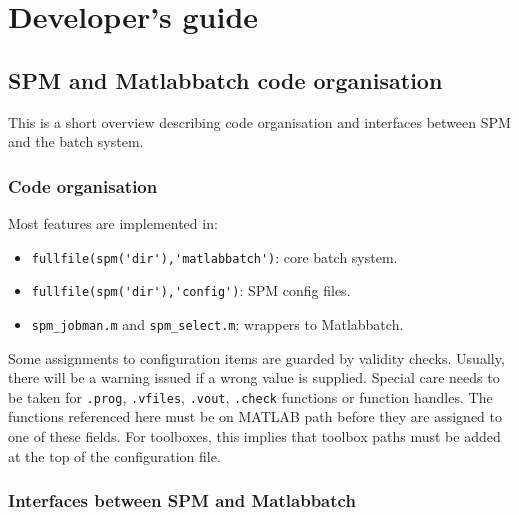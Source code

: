 \chapter{Developer's guide}
\label{Chap:batch:devel}

\section{SPM and Matlabbatch code organisation}

This is a short overview describing code organisation and interfaces between
SPM and the batch system.

\subsection{Code organisation}

Most features are implemented in:
\begin{itemize}
\item \verb|fullfile(spm('dir'),'matlabbatch')|: core batch system.
\item \verb|fullfile(spm('dir'),'config')|: SPM config files.
\item \verb|spm_jobman.m| and \verb|spm_select.m|: wrappers to Matlabbatch.
\end{itemize}

Some assignments to configuration items are guarded by validity
checks. Usually, there will be a warning issued if a wrong value is
supplied. Special care needs to be taken for \verb|.prog|, \verb|.vfiles|,
\verb|.vout|, \verb|.check| functions or function handles. The functions
referenced here must be on MATLAB path before they are assigned to one of
these fields. For toolboxes, this implies that toolbox paths must be added at
the top of the configuration file.

\subsection{Interfaces between SPM and Matlabbatch}

